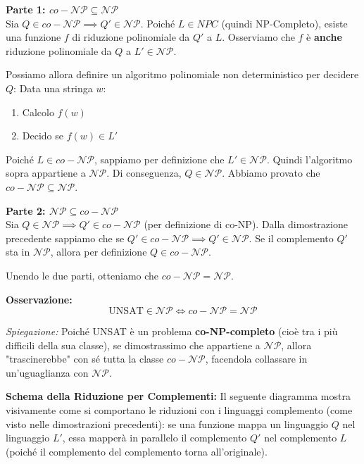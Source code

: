 \textbf{Parte 1: $co-\mathcal{NP} \subseteq \mathcal{NP}$}\\
Sia $Q \in co-\mathcal{NP} \implies Q' \in \mathcal{NP}$.
Poiché $L \in NPC$ (quindi NP-Completo), esiste una funzione $f$ di riduzione polinomiale da $Q'$ a $L$.
Osserviamo che $f$ è \textbf{anche} riduzione polinomiale da $Q$ a $L' \in \mathcal{NP}$.

Possiamo allora definire un algoritmo polinomiale non deterministico per decidere $Q$:
Data una stringa $w$:
\begin{enumerate}
    \item Calcolo $f(w)$
    \item Decido se $f(w) \in L'$
\end{enumerate}
Poiché $L \in co-\mathcal{NP}$, sappiamo per definizione che $L' \in \mathcal{NP}$. Quindi l'algoritmo sopra appartiene a $\mathcal{NP}$. Di conseguenza, $Q \in \mathcal{NP}$.
Abbiamo provato che $co-\mathcal{NP} \subseteq \mathcal{NP}$.

\textbf{Parte 2: $\mathcal{NP} \subseteq co-\mathcal{NP}$}\\
Sia $Q \in \mathcal{NP} \implies Q' \in co-\mathcal{NP}$ (per definizione di co-NP).
Dalla dimostrazione precedente sappiamo che se $Q' \in co-\mathcal{NP} \implies Q' \in \mathcal{NP}$.
Se il complemento $Q'$ sta in $\mathcal{NP}$, allora per definizione $Q \in co-\mathcal{NP}$.

Unendo le due parti, otteniamo che $co-\mathcal{NP} = \mathcal{NP}$.

\vspace{0.5cm}
\textbf{Osservazione:} 
$$ \text{UNSAT} \in \mathcal{NP} \iff co-\mathcal{NP} = \mathcal{NP} $$

\textit{Spiegazione:} Poiché UNSAT è un problema \textbf{co-NP-completo} (cioè tra i più difficili della sua classe), se dimostrassimo che appartiene a $\mathcal{NP}$, allora "trascinerebbe" con sé tutta la classe $co-\mathcal{NP}$, facendola collassare in un'uguaglianza con $\mathcal{NP}$.

\vspace{0.4cm}
\textbf{Schema della Riduzione per Complementi:}
Il seguente diagramma mostra visivamente come si comportano le riduzioni con i linguaggi complemento (come visto nelle dimostrazioni precedenti): se una funzione mappa un linguaggio $Q$ nel linguaggio $L'$, essa mapperà in parallelo il complemento $Q'$ nel complemento $L$ (poiché il complemento del complemento torna all'originale).

